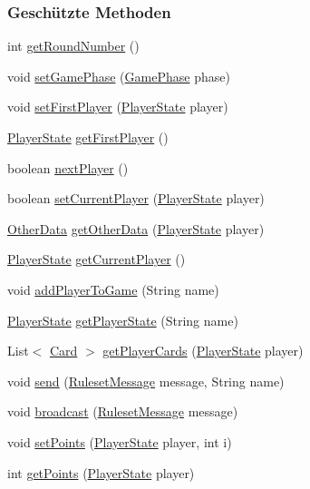 \subsubsection*{Geschützte Methoden}
\begin{DoxyCompactItemize}
\item 
int \hyperlink{a00068_acd8fc0de78babbeb68f3e5ebfd89b340}{get\-Round\-Number} ()
\item 
void \hyperlink{a00068_ae700f70fdcd3ffa8f38567d207770244}{set\-Game\-Phase} (\hyperlink{a00060}{Game\-Phase} phase)
\item 
void \hyperlink{a00068_abfad91f4802937b01bda5b2fc4ad499c}{set\-First\-Player} (\hyperlink{a00065}{Player\-State} player)
\item 
\hyperlink{a00065}{Player\-State} \hyperlink{a00068_a7b443a96d6cc6e723b99b00d441fc5eb}{get\-First\-Player} ()
\item 
boolean \hyperlink{a00068_a10c358cccf398b147ebc2a7271d869c0}{next\-Player} ()
\item 
boolean \hyperlink{a00068_aad1368713e8ecbe803fcde62393d008e}{set\-Current\-Player} (\hyperlink{a00065}{Player\-State} player)
\item 
\hyperlink{a00064}{Other\-Data} \hyperlink{a00068_af2759758090aa05b6f08d2ede0a97e34}{get\-Other\-Data} (\hyperlink{a00065}{Player\-State} player)
\item 
\hyperlink{a00065}{Player\-State} \hyperlink{a00068_ad3e8a11e9c53ca1b4bb6e753e48ef5ed}{get\-Current\-Player} ()
\item 
void \hyperlink{a00068_ab48377dd9b34abe6e862684bf03b80da}{add\-Player\-To\-Game} (String name)
\item 
\hyperlink{a00065}{Player\-State} \hyperlink{a00068_a5a7c0e8284adefd018fe67ccb65a571f}{get\-Player\-State} (String name)
\item 
List$<$ \hyperlink{a00054}{Card} $>$ \hyperlink{a00068_a68d47ae23b4bb4d81b2ef9905bab74b5}{get\-Player\-Cards} (\hyperlink{a00065}{Player\-State} player)
\item 
void \hyperlink{a00068_ac7ed1f7d4817c934b1cdf11c400b0f98}{send} (\hyperlink{a00053}{Ruleset\-Message} message, String name)
\item 
void \hyperlink{a00068_a559d5b042d1ab3092ca4f3d8c99de21d}{broadcast} (\hyperlink{a00053}{Ruleset\-Message} message)
\item 
void \hyperlink{a00068_aba6555f51361c42bdd044240d235ffb0}{set\-Points} (\hyperlink{a00065}{Player\-State} player, int i)
\item 
int \hyperlink{a00068_a2e36d7ff92b92375d51be1900c74f546}{get\-Points} (\hyperlink{a00065}{Player\-State} player)

\end{DoxyCompactItemize}
